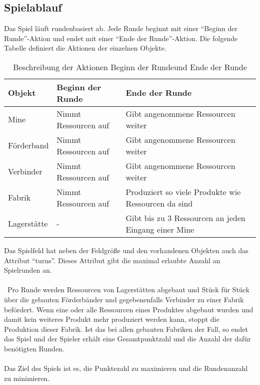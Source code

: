 \subsection{Spielablauf}
Das Spiel läuft rundenbasiert ab. Jede Runde beginnt mit einer “Beginn der Runde”-Aktion und endet mit einer “Ende der Runde”-Aktion.
Die folgende Tabelle definiert die Aktionen der einzelnen Objekte. 
\begin{table}
\begin{center}
\begin{tabular}{ | l | l | l | } 
	\hline
	\textbf{Objekt}& \textbf{Beginn der Runde} & \textbf{Ende der Runde} \\ \hline
	Mine & Nimmt Ressourcen auf & Gibt angenommene Ressourcen weiter \\ \hline
	Förderband & Nimmt Ressourcen auf & Gibt angenommene Ressourcen weiter \\ \hline
	Verbinder & Nimmt Ressourcen auf & Gibt angenommene Ressourcen weiter \\ \hline
	Fabrik & Nimmt Ressourcen auf & Produziert so viele Produkte wie Ressourcen da sind \\ \hline
	Lagerstätte & - & Gibt bis zu 3 Ressourcen an jeden Eingang einer Mine \\ \hline
\end{tabular}
\caption{Beschreibung der Aktionen \dq{}Beginn der Runde\dq  und \dq{}Ende der Runde\dq }
\end{center}
\end{table}
Das Spielfeld hat neben der Feldgröße und den vorhandenen Objekten auch das Attribut “turns”. Dieses Attribut gibt die maximal erlaubte Anzahl an Spielrunden an.
\\\\\
Pro Runde werden Ressourcen von Lagerstätten abgebaut und Stück für Stück über die gebauten Förderbänder und gegebenenfalls Verbinder zu einer Fabrik befördert. Wenn eine oder alle Ressourcen eines Produktes abgebaut wurden und damit kein weiteres Produkt mehr produziert werden kann, stoppt die Produktion dieser Fabrik. Ist das bei allen gebauten Fabriken der Fall, so endet das Spiel und der Spieler erhält eine Gesamtpunktzahl und die Anzahl der dafür benötigten Runden.
\\\\
Das Ziel des Spiels ist es, die Punktezahl zu maximieren und die Rundenanzahl zu minimieren.


